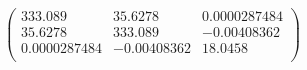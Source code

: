 \documentclass{article}
\begin{document}
\[\left(
\begin{array}{ccc}
 333.089 & 35.6278 & 0.0000287484 \\
 35.6278 & 333.089 & -0.00408362 \\
 0.0000287484 & -0.00408362 & 18.0458 \\
\end{array}
\right)\]
\end{document}
